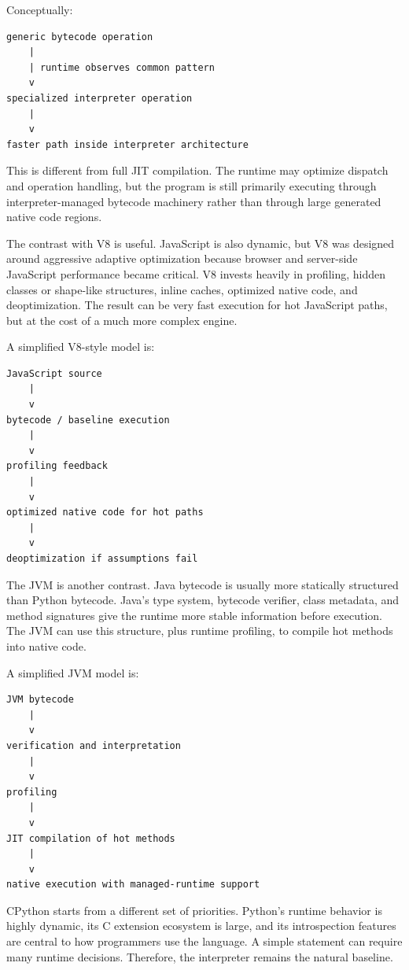 Conceptually:

\begin{verbatim}
generic bytecode operation
    |
    | runtime observes common pattern
    v
specialized interpreter operation
    |
    v
faster path inside interpreter architecture
\end{verbatim}

This is different from full JIT compilation. The runtime may optimize dispatch and operation handling, but the program is still primarily executing through interpreter-managed bytecode machinery rather than through large generated native code regions.

The contrast with V8 is useful. JavaScript is also dynamic, but V8 was designed around aggressive adaptive optimization because browser and server-side JavaScript performance became critical. V8 invests heavily in profiling, hidden classes or shape-like structures, inline caches, optimized native code, and deoptimization. The result can be very fast execution for hot JavaScript paths, but at the cost of a much more complex engine.

A simplified V8-style model is:

\begin{verbatim}
JavaScript source
    |
    v
bytecode / baseline execution
    |
    v
profiling feedback
    |
    v
optimized native code for hot paths
    |
    v
deoptimization if assumptions fail
\end{verbatim}

The JVM is another contrast. Java bytecode is usually more statically structured than Python bytecode. Java's type system, bytecode verifier, class metadata, and method signatures give the runtime more stable information before execution. The JVM can use this structure, plus runtime profiling, to compile hot methods into native code.

A simplified JVM model is:

\begin{verbatim}
JVM bytecode
    |
    v
verification and interpretation
    |
    v
profiling
    |
    v
JIT compilation of hot methods
    |
    v
native execution with managed-runtime support
\end{verbatim}

CPython starts from a different set of priorities. Python's runtime behavior is highly dynamic, its C extension ecosystem is large, and its introspection features are central to how programmers use the language. A simple statement can require many runtime decisions. Therefore, the interpreter remains the natural baseline.

